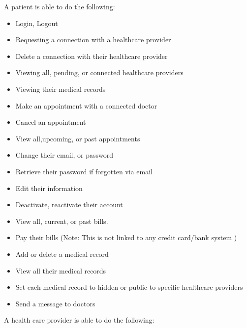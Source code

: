 \documentclass[12pt]{report}
\begin{document}
A patient is able to do the following:
\begin{itemize}
\item Login, Logout
\item Requesting a connection with a healthcare provider
\item Delete a connection with their healthcare provider
\item Viewing all, pending, or connected healthcare providers
\item Viewing their medical records
\item Make an appointment with a connected doctor
\item Cancel an appointment 
\item View all,upcoming, or past appointments
\item Change their email, or password
\item Retrieve their password if forgotten via email
\item Edit their information
\item Deactivate, reactivate their account
\item View all, current, or past bills.
\item Pay their bills (Note: This is not linked to any credit card/bank system ) 
\item Add or delete a medical record
\item View all their medical records
\item Set each medical record to hidden or public to specific healthcare providers
\item Send a message to doctors
\end{itemize}
A health care provider is able to do the following:
\end{document}
